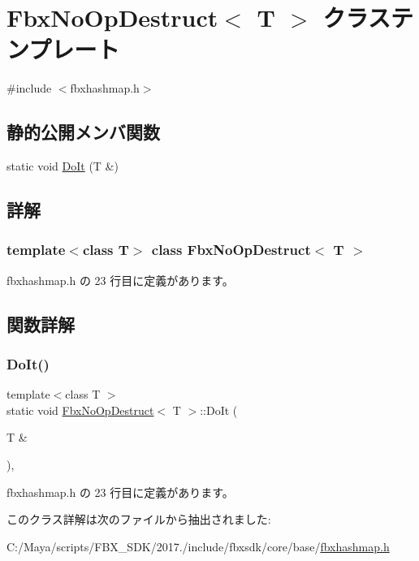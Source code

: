 \hypertarget{class_fbx_no_op_destruct}{}\section{Fbx\+No\+Op\+Destruct$<$ T $>$ クラステンプレート}
\label{class_fbx_no_op_destruct}


{\ttfamily \#include $<$fbxhashmap.\+h$>$}

\subsection*{静的公開メンバ関数}
\begin{DoxyCompactItemize}
\item 
static void \hyperlink{class_fbx_no_op_destruct_a7ec896ae67c8bbd02a6147b8936a55fe}{Do\+It} (T \&)
\end{DoxyCompactItemize}


\subsection{詳解}
\subsubsection*{template$<$class T$>$\newline
class Fbx\+No\+Op\+Destruct$<$ T $>$}



 fbxhashmap.\+h の 23 行目に定義があります。



\subsection{関数詳解}
\mbox{\label{class_fbx_no_op_destruct_a7ec896ae67c8bbd02a6147b8936a55fe}} 
\subsubsection{\texorpdfstring{Do\+It()}{DoIt()}}
{\footnotesize\ttfamily template$<$class T $>$ \\
static void \hyperlink{class_fbx_no_op_destruct}{Fbx\+No\+Op\+Destruct}$<$ T $>$\+::Do\+It (\begin{DoxyParamCaption}\item[{T \&}]{ }\end{DoxyParamCaption})\hspace{0.3cm}{\ttfamily [inline]}, {\ttfamily [static]}}



 fbxhashmap.\+h の 23 行目に定義があります。



このクラス詳解は次のファイルから抽出されました\+:\begin{DoxyCompactItemize}
\item 
C\+:/\+Maya/scripts/\+F\+B\+X\+\_\+\+S\+D\+K/2017./include/fbxsdk/core/base/\hyperlink{fbxhashmap_8h}{fbxhashmap.\+h}\end{DoxyCompactItemize}
